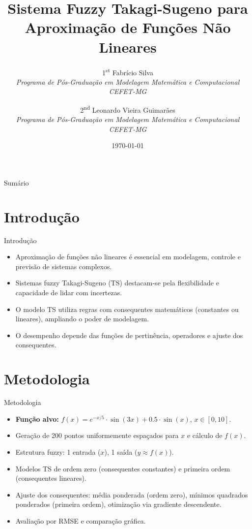 \documentclass[aspectratio=169]{beamer}
\title[Sistema Fuzzy Takagi-Sugeno]{Sistema Fuzzy Takagi-Sugeno para Aproximação de Funções Não Lineares}
\author[Fabrício Silva, Leonardo Vieira Guimarães]{
    1\textsuperscript{st} Fabrício Silva \\
    \textit{Programa de Pós-Graduação em Modelagem Matemática e Computacional} \\
    \textit{CEFET-MG}
    \and
    2\textsuperscript{nd} Leonardo Vieira Guimarães \\
    \textit{Programa de Pós-Graduação em Modelagem Matemática e Computacional} \\
    \textit{CEFET-MG}
}
\institute[CEFET-MG]{Programa de Pós-Graduação em Modelagem Matemática e Computacional, CEFET-MG}
\date{\today}
\begin{document}
\begin{frame}
    \titlepage
\end{frame}

\begin{frame}{Sumário}
    \tableofcontents
\end{frame}

\section{Introdução}

\begin{frame}{Introdução}
    \begin{itemize}
        \item Aproximação de funções não lineares é essencial em modelagem, controle e previsão de sistemas complexos.
        \item Sistemas fuzzy Takagi-Sugeno (TS) destacam-se pela flexibilidade e capacidade de lidar com incertezas.
        \item O modelo TS utiliza regras com consequentes matemáticos (constantes ou lineares), ampliando o poder de modelagem.
        \item O desempenho depende das funções de pertinência, operadores e ajuste dos consequentes.
    \end{itemize}
\end{frame}

\section{Metodologia}

\begin{frame}{Metodologia}
    \begin{itemize}
        \item \textbf{Função alvo:} $f(x) = e^{-x/5} \cdot \sin(3x) + 0.5 \cdot \sin(x)$, $x \in [0, 10]$.
        \item Geração de 200 pontos uniformemente espaçados para $x$ e cálculo de $f(x)$.
        \item Estrutura fuzzy: 1 entrada ($x$), 1 saída ($y \approx f(x)$).
        \item Modelos TS de ordem zero (consequentes constantes) e primeira ordem (consequentes lineares).
        \item Ajuste dos consequentes: média ponderada (ordem zero), mínimos quadrados ponderados (primeira ordem), otimização via gradiente descendente.
        \item Avaliação por RMSE e comparação gráfica.
    \end{itemize}
\end{frame}
\end{document}
